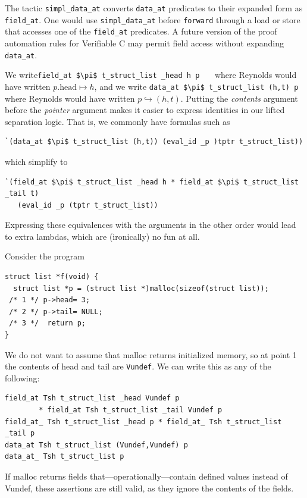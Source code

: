 \documentclass[12pt,fleqn,openany,oneside,showtrims]{memoir}
\begin{document}
The tactic \lstinline{simpl_data_at} converts 
\lstinline{data_at} predicates to their 
expanded form as \lstinline{field_at}.
One would use \lstinline{simpl_data_at}
before \lstinline{forward} through a load or store
that accesses one of the \lstinline{field_at}
predicates.  A future version of the proof automation
rules for Verifiable C may permit field access without
expanding \lstinline{data_at}.

We write\newline \lstinline{field_at $\pi$ t_struct_list _head h p}
\ \ \ where Reynolds would have written $p.\mathrm{head}\mapsto h$,
and we write 
\lstinline{data_at $\pi$ t_struct_list (h,t) p}
where Reynolds would have written $p\hookrightarrow(h,t)$.
Putting the \emph{contents} argument before the \emph{pointer}
argument makes it easier to express identities in our lifted
separation logic.  That is, we commonly have formulas such as
\begin{lstlisting}
`(data_at $\pi$ t_struct_list (h,t)) (eval_id _p )tptr t_struct_list))
\end{lstlisting}
\vspace{-\baselineskip}
which simplify to 
\begin{lstlisting}
`(field_at $\pi$ t_struct_list _head h * field_at $\pi$ t_struct_list _tail t)
   (eval_id _p (tptr t_struct_list))
\end{lstlisting}
\vspace{-\baselineskip}
Expressing these equivalences with the arguments in the other order
would lead to extra lambdas, which are
(ironically) no fun at all.

Consider the program
\begin{lstlisting}
struct list *f(void) {
  struct list *p = (struct list *)malloc(sizeof(struct list));
 /* 1 */ p->head= 3;
 /* 2 */ p->tail= NULL;
 /* 3 */  return p;
}
\end{lstlisting}
We do not want to assume that malloc returns initialized memory,
so at point 1 the contents of head and tail are \lstinline{Vundef}.
We can write this as any of the following:
\begin{lstlisting}
field_at Tsh t_struct_list _head Vundef p 
        * field_at Tsh t_struct_list _tail Vundef p
field_at_ Tsh t_struct_list _head p * field_at_ Tsh t_struct_list _tail p
data_at Tsh t_struct_list (Vundef,Vundef) p
data_at_ Tsh t_struct_list p
\end{lstlisting}
If malloc returns fields that---operationally---contain defined
values instead of Vundef, these assertions are still valid,
as they ignore the contents of the fields.
\end{document}
